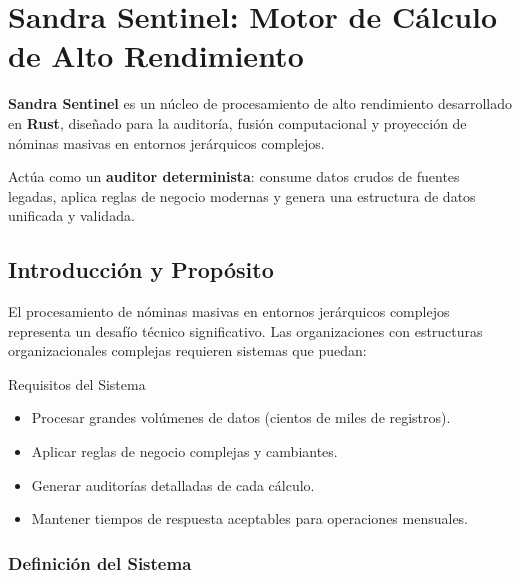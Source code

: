 \chapter{Sandra Sentinel: Motor de Cálculo de Alto Rendimiento}

\textbf{Sandra Sentinel} es un núcleo de procesamiento de alto rendimiento desarrollado en \textbf{Rust}, diseñado para la auditoría, fusión computacional y proyección de nóminas masivas en entornos jerárquicos complejos.


Actúa como un \textbf{auditor determinista}: consume datos crudos de fuentes legadas, aplica reglas de negocio modernas y genera una estructura de datos unificada y validada.

\section{Introducción y Propósito}

El procesamiento de nóminas masivas en entornos jerárquicos complejos representa un desafío técnico significativo. Las organizaciones con estructuras organizacionales complejas requieren sistemas que puedan:

\begin{caja}{Requisitos del Sistema}
\begin{itemize}
\item Procesar grandes volúmenes de datos (cientos de miles de registros).
\item Aplicar reglas de negocio complejas y cambiantes.
\item Generar auditorías detalladas de cada cálculo.
\item Mantener tiempos de respuesta aceptables para operaciones mensuales.
\end{itemize}
\end{caja}


\subsection{Definición del Sistema}

